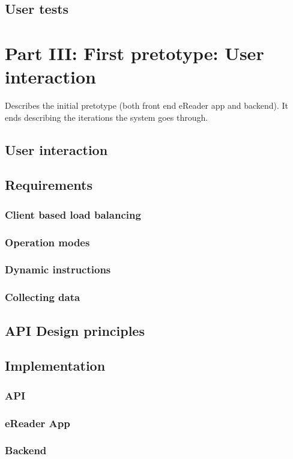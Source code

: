 \documentclass[a4paper,10pt]{article}
\begin{document}
\subsection{User tests}

\section{Part III: First pretotype: User interaction}
Describes the initial pretotype (both front end eReader app and backend).
It ends describing the iterations the system goes through.
\subsection{User interaction}
\subsection{Requirements}
\subsubsection{Client based load balancing}
\subsubsection{Operation modes}
\subsubsection{Dynamic instructions}
\subsubsection{Collecting data}
\subsection{API Design principles}
\subsection{Implementation}
\subsubsection{API}
\subsubsection{eReader App}
\subsubsection{Backend}
\end{document}
